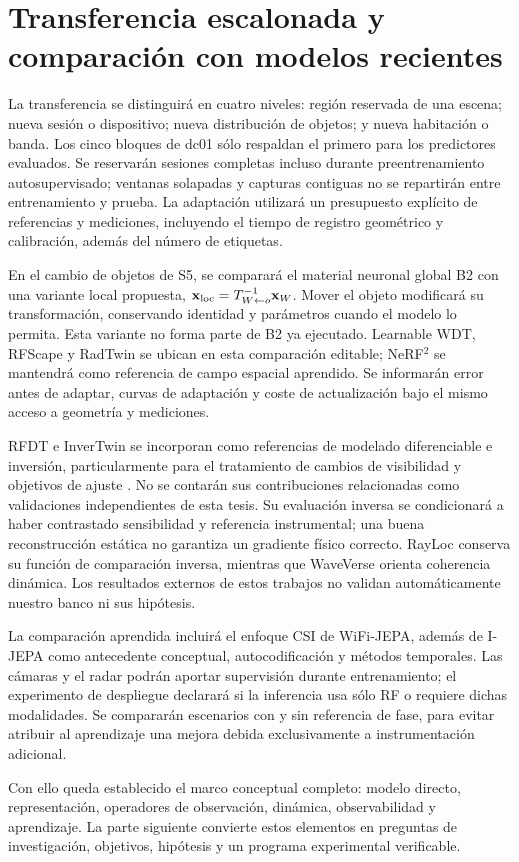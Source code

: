 \section{Transferencia escalonada y comparación con modelos recientes}
\label{sec:transfer_updated_program}

La transferencia se distinguirá en cuatro niveles: región reservada de una escena;
nueva sesión o dispositivo; nueva distribución de objetos; y nueva habitación o banda.
Los cinco bloques de dc01 sólo respaldan el primero para los predictores evaluados.
Se reservarán sesiones completas incluso durante preentrenamiento autosupervisado;
ventanas solapadas y capturas contiguas no se repartirán entre entrenamiento y prueba.
La adaptación utilizará un presupuesto explícito de referencias y mediciones, incluyendo
el tiempo de registro geométrico y calibración, además del número de etiquetas.

En el cambio de objetos de S5, se comparará el material neuronal global B2 con una
variante local propuesta, $\mathbf x_{\rm loc}=T_{W\leftarrow o}^{-1}\mathbf x_W$.
Mover el objeto modificará su transformación, conservando identidad y parámetros
cuando el modelo lo permita. Esta variante no forma parte de B2 ya ejecutado.
Learnable WDT, RFScape y RadTwin se ubican en esta comparación editable; NeRF$^2$
se mantendrá como referencia de campo espacial aprendido. Se informarán error antes
de adaptar, curvas de adaptación y coste de actualización bajo el mismo acceso a
geometría y mediciones.

RFDT e InverTwin se incorporan como referencias de modelado diferenciable e inversión,
particularmente para el tratamiento de cambios de visibilidad y objetivos de ajuste
\citep{Chen2026RFDT,Chen2025InverTwin}. No se contarán sus contribuciones relacionadas
como validaciones independientes de esta tesis. Su evaluación inversa se condicionará
a haber contrastado sensibilidad y referencia instrumental; una buena reconstrucción
estática no garantiza un gradiente físico correcto. RayLoc conserva su función de
comparación inversa, mientras que WaveVerse orienta coherencia dinámica. Los resultados
externos de estos trabajos no validan automáticamente nuestro banco ni sus hipótesis.

La comparación aprendida incluirá el enfoque CSI de WiFi-JEPA, además de I-JEPA como
antecedente conceptual, autocodificación y métodos temporales. Las cámaras y el radar
podrán aportar supervisión durante entrenamiento; el experimento de despliegue declarará
si la inferencia usa sólo RF o requiere dichas modalidades. Se compararán escenarios
con y sin referencia de fase, para evitar atribuir al aprendizaje una mejora debida
exclusivamente a instrumentación adicional.

Con ello queda establecido el marco conceptual completo: modelo directo, representación,
operadores de observación, dinámica, observabilidad y aprendizaje. La parte siguiente
convierte estos elementos en preguntas de investigación, objetivos, hipótesis y un programa
experimental verificable.
